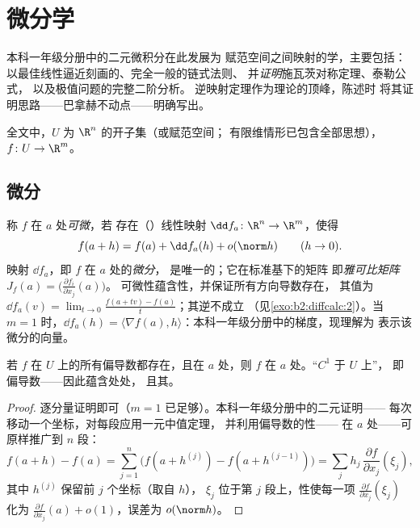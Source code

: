\chapter{微分学}\label{ch:b2:diffcalc}

本科一年级分册中的二元微积分在此发展为
赋范空间之间映射的学，主要包括：
以最佳线性逼近刻画的\emph{}、完全一般的链式法则、
并\emph{证明}施瓦茨对称定理、泰勒公式，
以及极值问题的完整二阶分析。
逆映射定理作为理论的顶峰，陈述时
将其证明思路——巴拿赫不动点——明确写出。

全文中，$U$ 为 $\R^n$ 的开子集（或赋范空间；
有限维情形已包含全部思想），$f \colon U \to
\R^m$。

\section{微分}

\begin{definition}\label{def:b2:diffcalc:differential}
称 $f$ 在 $a$ 处\emph{可微}，若
存在（）线性映射 $\dd f_a \colon \R^n \to \R^m$，使得
\[
f(a + h) = f(a) + \dd f_a(h) + o(\norm h)
\qquad (h \to 0).
\]
映射 $\dd f_a$，即 $f$ 在 $a$ 处的\emph{微分}，
是唯一的；它在标准基下的矩阵
即\emph{雅可比矩阵} $J_f(a) =
\bigl(\frac{\partial f_i}{\partial x_j}(a)\bigr)$。
可微性蕴含性，并保证所有方向导数存在，
其值为 $\dd f_a(v) = \lim_{t\to0}\frac{f(a + tv)
- f(a)}{t}$；其逆不成立
（见\cref{exo:b2:diffcalc:2}）。当 $m = 1$ 时，$\dd f_a(h) = \langle
\nabla f(a), h\rangle$：本科一年级分册中的梯度，现理解为
表示该微分的向量。
\end{definition}

\begin{theorem}[$C^1$ 判别法]\label{thm:b2:diffcalc:c1}
若 $f$ 在 $U$ 上的所有偏导数都存在，且在
$a$ 处，则 $f$ 在 $a$ 处。“$C^1$ 于 $U$ 上”，
即偏导数——因此蕴含处处，
且其。
\end{theorem}

\begin{proof}
逐分量证明即可（$m = 1$ 已足够）。本科一年级分册中的二元证明——
每次移动一个坐标，对每段应用一元中值定理，
并利用偏导数的性——
在 $a$ 处——可原样推广到 $n$ 段：
\[
f(a + h) - f(a) = \sum_{j=1}^{n} \bigl(f(a + h^{(j)}) - f(a +
h^{(j-1)})\bigr)
= \sum_j h_j\,\frac{\partial f}{\partial x_j}(\xi_j),
\]
其中 $h^{(j)}$ 保留前 $j$ 个坐标（取自 $h$），
$\xi_j$ 位于第 $j$ 段上，性使每一项
$\frac{\partial f}{\partial x_j}(\xi_j)$ 化为 $\frac{\partial
f}{\partial x_j}(a) + o(1)$，误差为 $o(\norm h)$。
\end{proof}

